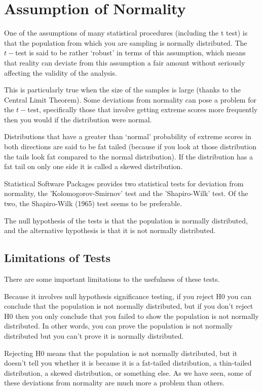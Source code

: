 \documentclass[french]{article}
\begin{document}
\section{Assumption of Normality}

One of the assumptions of many statistical procedures (including the t test) is that the population from which you are sampling is normally distributed. The $t-$test is said to be rather ‘robust’ in terms of this assumption, which means that reality can deviate from this assumption a fair amount without seriously affecting the validity of the analysis. 

This is particularly true when the size of the samples is large (thanks to the Central Limit Theorem). Some deviations from normality can pose a problem for the $t-$test, specifically those that involve getting extreme scores more frequently then you would if the distribution were normal. 

Distributions that have a greater than ‘normal’ probability of extreme scores in both directions are said to be fat tailed (because if you look at those distribution the tails look fat compared to the normal distribution). If the distribution has a fat tail on only one side it is called a skewed distribution. 
 
Statistical Software Packages provides two statistical tests for deviation from normality, the 'Kolomogorov-Smirnov' test and the 'Shapiro-Wilk' test. Of the two, the Shapiro-Wilk (1965) test seems to be preferable.

The null hypothesis of the tests is that the population is normally distributed, and the alternative hypothesis is that it is not normally distributed. 

\subsection{Limitations of Tests}
There are some important limitations to the usefulness of these tests.
 
Because it involves null hypothesis significance testing, if you reject H0 you can conclude that the population is not normally distributed, but if you don't reject H0 then you only conclude that you failed to show the population is not normally distributed. In other words, you can prove the population is not normally distributed but you can't prove it is normally distributed.
 
Rejecting H0 means that the population is not normally distributed, but it doesn't tell you whether it is because it is a fat-tailed distribution, a thin-tailed distribution, a skewed distribution, or something else. As we have seen, some of these deviations from normality are much more a problem than others.
 
\end{document}
